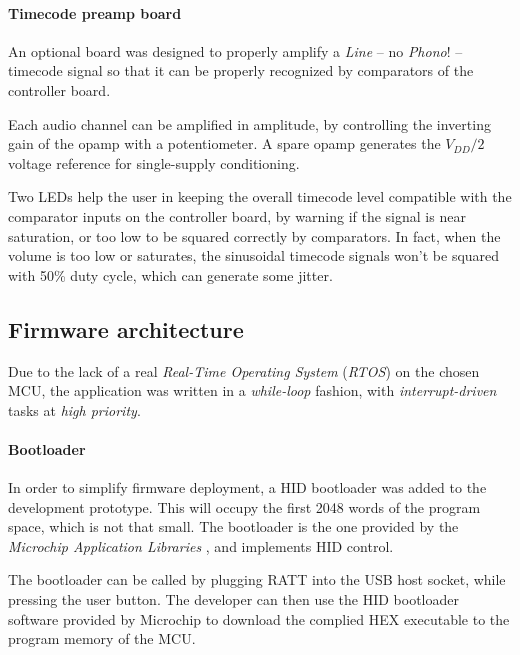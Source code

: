 \documentclass[a4paper,10pt]{article}
\begin{document}
\begin{multicols}{2}
\INSFIG


\paragraph{Timecode preamp board}
An optional board was designed to properly amplify a \emph{Line} -- no
\emph{Phono}! -- timecode signal so that it can be properly recognized by
comparators of the controller board.

Each audio channel can be amplified in amplitude, by controlling the inverting
gain of the opamp with a potentiometer. A spare opamp generates the $V_{DD}/2$
voltage reference for single-supply conditioning.

Two LEDs help the user in keeping the overall timecode level compatible with
the comparator inputs on the controller board, by warning if the signal is
near saturation, or too low to be squared correctly by comparators.
In fact, when the volume is too low or saturates, the sinusoidal timecode
signals won't be squared with 50\% duty cycle, which can generate some jitter.

\INSFIG


\subsection{Firmware architecture}

Due to the lack of a real \emph{Real-Time Operating System} (\emph{RTOS}) on
the chosen MCU, the application was written in a \emph{while-loop} fashion,
with \emph{interrupt-driven} tasks at \emph{high priority}.

\TODO

\paragraph{Bootloader}
In order to simplify firmware deployment, a HID bootloader was added to the
development prototype. This will occupy the first 2048 words of the program
space, which is not that small. The bootloader is the one provided by the
\emph{Microchip Application Libraries} \CITEME, and implements HID control.

The bootloader can be called by plugging RATT into the USB host socket, while
pressing the user button. The developer can then use the HID bootloader
software provided by Microchip to download the complied HEX executable to the
program memory of the MCU.



\end{multicols}
\end{document}
